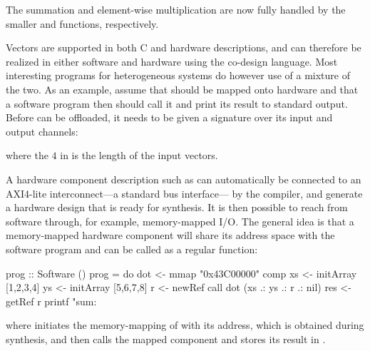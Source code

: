 \documentclass[../paper.tex]{subfiles}
\begin{document}
\noindent The summation and element-wise multiplication are now fully handled by the smaller  and  functions, respectively.


Vectors are supported in both C and hardware descriptions, and  can therefore be realized in either software and hardware using the co-design language. Most interesting programs for heterogeneous systems do however use of a mixture of the two. As an example, assume that  should be mapped onto hardware and that a software program then should call it and print its result to standard output. Before  can be offloaded, it needs to be given a signature over its input and output channels:


\noindent where the $4$ in  is the length of the input vectors.

A hardware component description such as  can automatically be connected to an AXI4-lite interconnect---a standard bus interface--- by the compiler, and generate a hardware design that is ready for synthesis. It is then possible to reach  from software through, for example, memory-mapped I/O. The general idea is that a memory-mapped hardware component will share its address space with the software program and can be called as a regular function:

\begin{code}
prog :: Software ()
prog = do
  dot <- mmap "0x43C00000" comp
  xs  <- initArray [1,2,3,4]
  ys  <- initArray [5,6,7,8]
  r   <- newRef
  call dot (xs .: ys .: r .: nil)
  res <- getRef r
  printf "sum: %
\end{code}

\noindent where  initiates the memory-mapping of  with its address, which is obtained during synthesis, and  then calls the mapped component and stores its result in .
\end{document}
